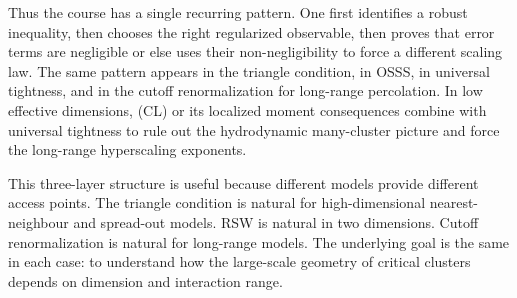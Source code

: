 \documentclass[11pt,reqno]{book}
\numberwithin{equation}{chapter}
\theoremstyle{plain}
\theoremstyle{definition}
\theoremstyle{remark}
\newcommand{\1}{\mathbf 1}
\begin{document}
Thus the course has a single recurring pattern. One first identifies a robust inequality, then chooses the right regularized observable, then proves that error terms are negligible or else uses their non-negligibility to force a different scaling law. The same pattern appears in the triangle condition, in OSSS, in universal tightness, and in the cutoff renormalization for long-range percolation.
In low effective dimensions, (CL) or its localized moment consequences combine with universal tightness to rule out the hydrodynamic many-cluster picture and force the long-range hyperscaling exponents.

This three-layer structure is useful because different models provide different access points. The triangle condition is natural for high-dimensional nearest-neighbour and spread-out models. RSW is natural in two dimensions. Cutoff renormalization is natural for long-range models. The underlying goal is the same in each case: to understand how the large-scale geometry of critical clusters depends on dimension and interaction range.
\end{document}

